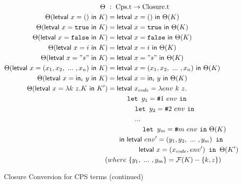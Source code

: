 \documentclass{article}
\theoremstyle{definition}
\theoremstyle{remark}
\numberwithin{equation}{section}
\begin{document}
\begin{figure}[!ht]
  \centering
\begin{align*}
\Theta\ &:\ \textrm{Cps.t} \to \textrm{Closure.t}\\     %
\Theta(\textsf{letval }x=()\textsf{ in }K)
    &=\textsf{letval }x=()\textsf{ in }\Theta(K)\\   %
\Theta(\textsf{letval }x=\texttt{true}\textsf{ in }K)
    &=\textsf{letval }x=\texttt{true}\textsf{ in }\Theta(K)\\   %
\Theta(\textsf{letval }x=\texttt{false}\textsf{ in }K)
    &=\textsf{letval }x=\texttt{false}\textsf{ in }\Theta(K)\\   %
\Theta(\textsf{letval }x=i\textsf{ in }K)
    &=\textsf{letval }x=i\textsf{ in }\Theta(K)\\   %
\Theta(\textsf{letval }x="s"\textsf{ in }K)
    &=\textsf{letval }x="s"\textsf{ in }\Theta(K)\\   %
\Theta(\textsf{letval }x=(x_1, x_2,\ ...\ , x_n)\textsf{ in }K)
    &=\textsf{letval }x=(x_1, x_2,\ ...\ , x_n)\textsf{ in }
    \Theta(K)\\ %
\Theta(\textsf{letval }x=\textsf{in}_i\ y\textsf{ in }K)
    &=\textsf{letval }x=\textsf{in}_i\ y\textsf{ in }\Theta(K)\\%
\Theta(\textsf{letval }x=\lambda k\ z.K\textsf{ in }K')
    &=\textsf{letval }x_{code}=\lambda env\ k\ z.\\
    &\kern1cm   \texttt{let }y_1=\texttt{\#}1\ env\ \texttt{in}\\
    &\kern1.4cm   \texttt{let }y_2=\texttt{\#}2\ env\ \texttt{in}\\
    &\kern1.4cm   ...\\
    &\kern1.8cm   \texttt{let }y_m=\texttt{\#}m\ env\ \texttt{in}\ \Theta(K)\\
    &\kern0.6cm\textsf{in letval }env'=(y_1, y_2, \ ...\ ,y_m)\texttt{ in}\\
    &\kern1.6cm\textsf{letval }x=(x_{code}, env')\texttt{ in }\Theta(K')\\
    (&where\ \{y_1,\ ...\ ,y_m\}=\mathcal{F}(K)-\{k, z\})%
\end{align*}
  \caption{Closure Conversion for CPS terms (continued)}
  \label{fig-sub}
\end{figure}



\end{document}
